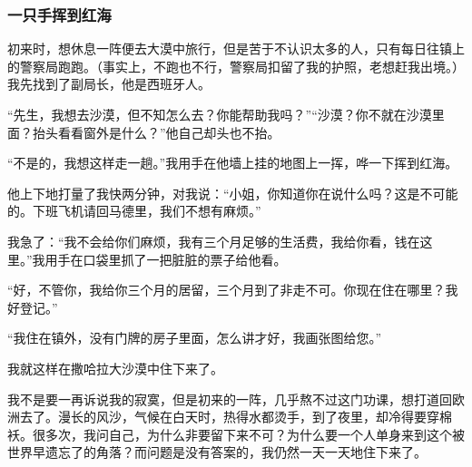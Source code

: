 \subsubsection*{一只手挥到红海}
\par 初来时，想休息一阵便去大漠中旅行，但是苦于不认识太多的人，只有每日往镇上的警察局跑跑。（事实上，不跑也不行，警察局扣留了我的护照，老想赶我出境。）我先找到了副局长，他是西班牙人。
\par “先生，我想去沙漠，但不知怎么去？你能帮助我吗？”“沙漠？你不就在沙漠里面？抬头看看窗外是什么？”他自己却头也不抬。
\par “不是的，我想这样走一趟。”我用手在他墙上挂的地图上一挥，哗一下挥到红海。
\par 他上下地打量了我快两分钟，对我说：“小姐，你知道你在说什么吗？这是不可能的。下班飞机请回马德里，我们不想有麻烦。”
\par 我急了：“我不会给你们麻烦，我有三个月足够的生活费，我给你看，钱在这里。”我用手在口袋里抓了一把脏脏的票子给他看。
\par “好，不管你，我给你三个月的居留，三个月到了非走不可。你现在住在哪里？我好登记。”
\par “我住在镇外，没有门牌的房子里面，怎么讲才好，我画张图给您。”
\par 我就这样在撒哈拉大沙漠中住下来了。
\par 我不是要一再诉说我的寂寞，但是初来的一阵，几乎熬不过这门功课，想打道回欧洲去了。漫长的风沙，气候在白天时，热得水都烫手，到了夜里，却冷得要穿棉袄。很多次，我问自己，为什么非要留下来不可？为什么要一个人单身来到这个被世界早遗忘了的角落？而问题是没有答案的，我仍然一天一天地住下来了。
